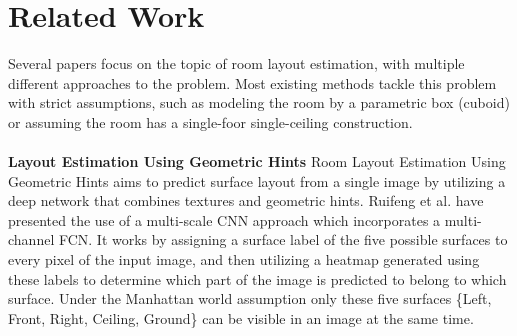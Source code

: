 \section{Related Work}
\label{sec:relatedwork}

Several papers focus on the topic of room layout estimation, with multiple
different approaches to the problem. Most existing methods tackle this problem
with strict assumptions, such as modeling the room by a parametric box (cuboid)
or assuming the room has a single-foor single-ceiling construction.

\paragraph{}

\textbf{Layout Estimation Using Geometric Hints} Room Layout Estimation Using
Geometric Hints\cite{8451365} aims to predict surface layout from a single image
by utilizing a deep network that combines textures and geometric hints. 
Ruifeng et al. \cite{8451365} have presented the use of a multi-scale CNN
approach which incorporates a multi-channel FCN. It works by assigning a surface
label of the five possible surfaces to every pixel of the input image, and then
utilizing a heatmap generated using these labels to determine which part of the
image is predicted to belong to which surface. Under the Manhattan world 
assumption\cite{790349} only these five surfaces \{Left, Front, Right, Ceiling,
Ground\} can be visible in an image at the same time.

